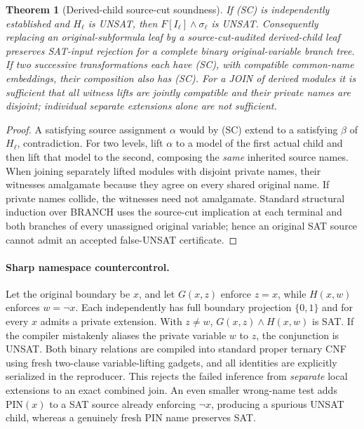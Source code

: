 \documentclass[11pt]{article}
\newtheorem{theorem}{Theorem}
\begin{document}
\begin{theorem}[Derived-child source-cut soundness]\label{th:sourcecut}
If (SC) is independently established and $H_\ell$ is UNSAT,
then $F[I_\ell]\land\sigma_\ell$ is UNSAT. Consequently replacing an
original-subformula leaf by a source-cut-audited derived-child leaf
preserves SAT-input rejection for a complete binary original-variable
branch tree. If two successive transformations each have (SC), with
compatible common-name embeddings, their composition also has (SC).
For a JOIN of derived modules it is sufficient that all witness
lifts are jointly compatible and their private names are disjoint;
individual separate extensions alone are \emph{not} sufficient.
\end{theorem}
\begin{proof}
A satisfying source assignment $\alpha$ would by (SC) extend to a
satisfying $\beta$ of $H_\ell$, contradiction. For two levels, lift
$\alpha$ to a model of the first actual child and then lift that
model to the second, composing the \emph{same} inherited source
names. When joining separately lifted modules with disjoint private
names, their witnesses amalgamate because they agree on every
shared original name. If private names collide, the witnesses need
not amalgamate. Standard structural induction over BRANCH uses
the source-cut implication at each terminal and both branches
of every unassigned original variable; hence an original SAT source
cannot admit an accepted false-UNSAT certificate.
\end{proof}

\paragraph{Sharp namespace countercontrol.}
Let the original boundary be $x$, and let
$G(x,z)$ enforce $z=x$, while $H(x,w)$ enforces $w=\neg x$.
Each independently has full boundary projection $\{0,1\}$ and
for every $x$ admits a private extension. With $z\ne w$,
$G(x,z)\land H(x,w)$ is SAT. If the compiler mistakenly aliases
the private variable $w$ to $z$, the conjunction is UNSAT.
Both binary relations are compiled into standard proper ternary
CNF using fresh two-clause variable-lifting gadgets, and
all identities are explicitly serialized in the reproducer.
This rejects the failed inference from \emph{separate} local
extensions to an exact combined join. An even smaller wrong-name
test adds $\mathrm{PIN}(x)$ to a SAT source already enforcing
$\neg x$, producing a spurious UNSAT child, whereas a
genuinely fresh PIN name preserves SAT.
\end{document}
